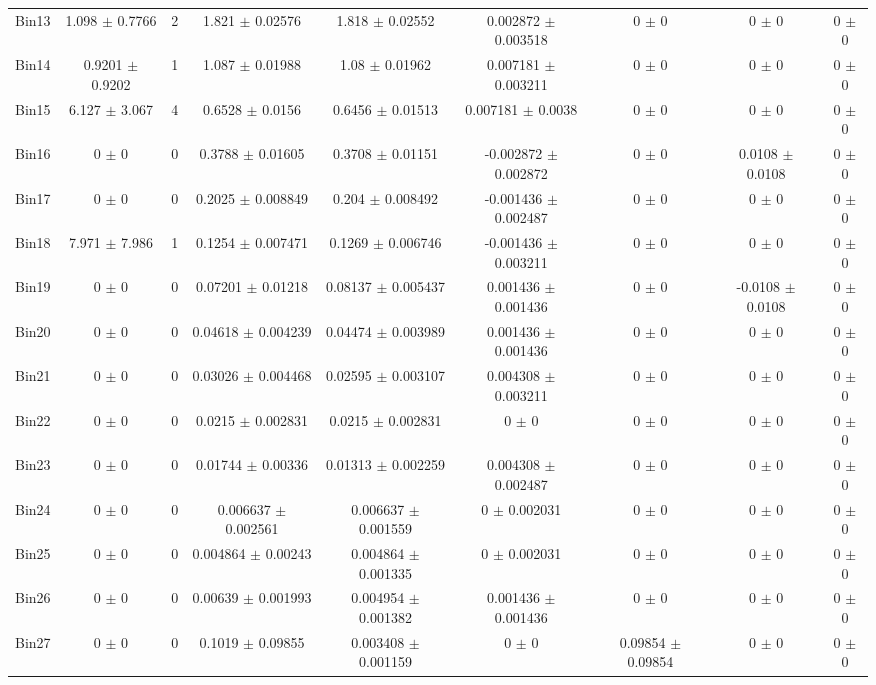 \begin{tabular}{@{\extracolsep{4pt}}lcccccccc@{}}
     Bin13 & 1.098 $\pm$ 0.7766 & 2 & 1.821 $\pm$ 0.02576 & 1.818 $\pm$ 0.02552 & 0.002872 $\pm$ 0.003518 & 0 $\pm$ 0 & 0 $\pm$ 0 & 0 $\pm$ 0 \\ 
     Bin14 & 0.9201 $\pm$ 0.9202 & 1 & 1.087 $\pm$ 0.01988 & 1.08 $\pm$ 0.01962 & 0.007181 $\pm$ 0.003211 & 0 $\pm$ 0 & 0 $\pm$ 0 & 0 $\pm$ 0 \\ 
     Bin15 & 6.127 $\pm$ 3.067 & 4 & 0.6528 $\pm$ 0.0156 & 0.6456 $\pm$ 0.01513 & 0.007181 $\pm$ 0.0038 & 0 $\pm$ 0 & 0 $\pm$ 0 & 0 $\pm$ 0 \\ 
     Bin16 & 0 $\pm$ 0 & 0 & 0.3788 $\pm$ 0.01605 & 0.3708 $\pm$ 0.01151 & -0.002872 $\pm$ 0.002872 & 0 $\pm$ 0 & 0.0108 $\pm$ 0.0108 & 0 $\pm$ 0 \\ 
     Bin17 & 0 $\pm$ 0 & 0 & 0.2025 $\pm$ 0.008849 & 0.204 $\pm$ 0.008492 & -0.001436 $\pm$ 0.002487 & 0 $\pm$ 0 & 0 $\pm$ 0 & 0 $\pm$ 0 \\ 
     Bin18 & 7.971 $\pm$ 7.986 & 1 & 0.1254 $\pm$ 0.007471 & 0.1269 $\pm$ 0.006746 & -0.001436 $\pm$ 0.003211 & 0 $\pm$ 0 & 0 $\pm$ 0 & 0 $\pm$ 0 \\ 
     Bin19 & 0 $\pm$ 0 & 0 & 0.07201 $\pm$ 0.01218 & 0.08137 $\pm$ 0.005437 & 0.001436 $\pm$ 0.001436 & 0 $\pm$ 0 & -0.0108 $\pm$ 0.0108 & 0 $\pm$ 0 \\ 
     Bin20 & 0 $\pm$ 0 & 0 & 0.04618 $\pm$ 0.004239 & 0.04474 $\pm$ 0.003989 & 0.001436 $\pm$ 0.001436 & 0 $\pm$ 0 & 0 $\pm$ 0 & 0 $\pm$ 0 \\ 
     Bin21 & 0 $\pm$ 0 & 0 & 0.03026 $\pm$ 0.004468 & 0.02595 $\pm$ 0.003107 & 0.004308 $\pm$ 0.003211 & 0 $\pm$ 0 & 0 $\pm$ 0 & 0 $\pm$ 0 \\ 
     Bin22 & 0 $\pm$ 0 & 0 & 0.0215 $\pm$ 0.002831 & 0.0215 $\pm$ 0.002831 & 0 $\pm$ 0 & 0 $\pm$ 0 & 0 $\pm$ 0 & 0 $\pm$ 0 \\ 
     Bin23 & 0 $\pm$ 0 & 0 & 0.01744 $\pm$ 0.00336 & 0.01313 $\pm$ 0.002259 & 0.004308 $\pm$ 0.002487 & 0 $\pm$ 0 & 0 $\pm$ 0 & 0 $\pm$ 0 \\ 
     Bin24 & 0 $\pm$ 0 & 0 & 0.006637 $\pm$ 0.002561 & 0.006637 $\pm$ 0.001559 & 0 $\pm$ 0.002031 & 0 $\pm$ 0 & 0 $\pm$ 0 & 0 $\pm$ 0 \\ 
     Bin25 & 0 $\pm$ 0 & 0 & 0.004864 $\pm$ 0.00243 & 0.004864 $\pm$ 0.001335 & 0 $\pm$ 0.002031 & 0 $\pm$ 0 & 0 $\pm$ 0 & 0 $\pm$ 0 \\ 
     Bin26 & 0 $\pm$ 0 & 0 & 0.00639 $\pm$ 0.001993 & 0.004954 $\pm$ 0.001382 & 0.001436 $\pm$ 0.001436 & 0 $\pm$ 0 & 0 $\pm$ 0 & 0 $\pm$ 0 \\ 
     Bin27 & 0 $\pm$ 0 & 0 & 0.1019 $\pm$ 0.09855 & 0.003408 $\pm$ 0.001159 & 0 $\pm$ 0 & 0.09854 $\pm$ 0.09854 & 0 $\pm$ 0 & 0 $\pm$ 0 \\ 

\end{tabular}
